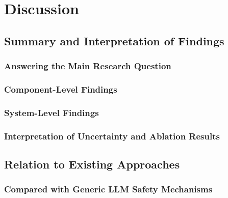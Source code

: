 \chapter{Discussion}

\section{Summary and Interpretation of Findings}


\subsection{Answering the Main Research Question}


\subsection{Component-Level Findings}


\subsection{System-Level Findings}


\subsection{Interpretation of Uncertainty and Ablation Results}


\begin{table}
  \centering
  \caption{Research questions and main findings.}
  \label{tab:research-questions-findings}
\end{table}

\section{Relation to Existing Approaches}


\subsection{Compared with Generic LLM Safety Mechanisms}

